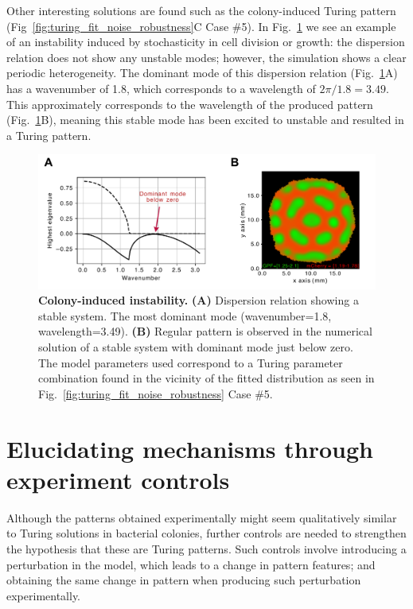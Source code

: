 Other interesting solutions are found such as the colony-induced Turing pattern (Fig~\ref{fig:turing_fit_noise_robustness}C Case \#5).
In Fig.~\ref{fig:colony_induced_turing} we see an example of an instability induced by stochasticity in cell division or growth: the dispersion relation does not show any unstable modes; however, the simulation shows a clear periodic heterogeneity.
The dominant mode of this dispersion relation (Fig.~\ref{fig:colony_induced_turing}A) has a wavenumber of 1.8, which corresponds to a wavelength of $2\pi/1.8=3.49$.
This approximately corresponds to the wavelength of the produced pattern (Fig.~\ref{fig:colony_induced_turing}B), meaning this stable mode has been excited to unstable and resulted in a Turing pattern.


\begin{figure}[H] %
    \centering
    \begin{adjustbox}{center}
        \includegraphics[width=1\textwidth]{chapters/Chapter 3/colony_induced_turing} %
    \end{adjustbox}
    \caption{\textbf{Colony-induced instability.}  \textbf{(A)} Dispersion relation showing a stable system. The most dominant mode (wavenumber=1.8, wavelength=3.49). \textbf{(B)} Regular pattern is observed in the numerical solution of a stable system with dominant mode just below zero. The model parameters used correspond to a Turing parameter combination found in the vicinity of the fitted distribution as seen in Fig.~\ref{fig:turing_fit_noise_robustness} Case \#5.}
    \label{fig:colony_induced_turing}
\end{figure}

\section{Elucidating mechanisms through experiment controls}
Although the patterns obtained experimentally might seem qualitatively similar to Turing solutions in bacterial colonies, further controls are needed to strengthen the hypothesis that these are Turing patterns.
Such controls involve introducing a perturbation in the model, which leads to a change in pattern features; and obtaining the same change in pattern when producing such perturbation experimentally.

